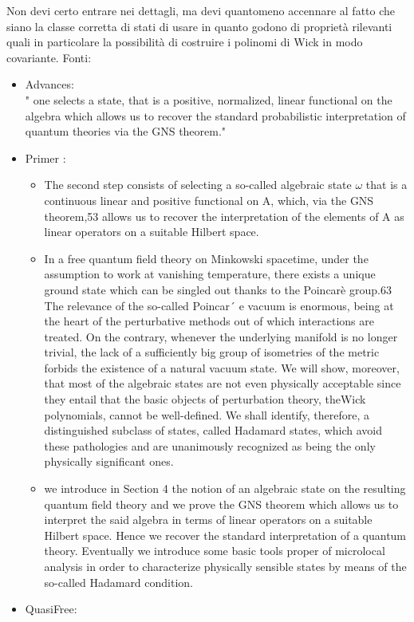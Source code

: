 \documentclass[Main]{subfiles}
\begin{document}
			\begin{Warning}
			Non devi certo entrare nei dettagli, ma devi quantomeno accennare al fatto che siano la classe corretta di stati di usare in quanto godono di proprietà rilevanti quali in particolare la possibilità di costruire i polinomi di Wick in modo covariante.
				Fonti: 
				\begin{itemize}
					\item Advances:\\
						" one selects a state, that is a positive, normalized, linear functional on the algebra which allows us to recover the standard probabilistic interpretation of quantum theories via the GNS theorem."
					\item Primer : 
						\begin{itemize}
							\item The second step consists of selecting a so-called algebraic state $\omega$ that is a continuous linear and positive functional on A, which, via the GNS theorem,53 allows us to recover the interpretation of the elements of A as linear operators on a suitable Hilbert space.
							\item  In a free quantum field theory on Minkowski spacetime, under the assumption to work at vanishing temperature, there exists a unique ground state which can be singled out thanks to the Poincarè group.63
								The relevance of the so-called Poincar´ e vacuum is enormous, being at the heart of the perturbative
methods out of which interactions are treated. 
								On the contrary, whenever the underlying manifold is no longer trivial, the lack of a sufficiently big group of isometries of the metric forbids the existence of a natural vacuum state. We will show, moreover, that most of the algebraic states are not even physically acceptable since they entail that the basic objects of perturbation theory, theWick polynomials, cannot be well-defined. 
								We shall identify, therefore, a distinguished subclass of states, called Hadamard states, which avoid these pathologies and are unanimously recognized as being the only physically significant ones.
							\item we introduce in Section 4 the notion of an algebraic state on the resulting quantum field theory and we prove the GNS theorem which allows us to interpret the said algebra in terms of linear operators on a suitable Hilbert space. 
								Hence we recover the standard interpretation of a quantum theory. Eventually we introduce some basic tools proper of microlocal analysis in order to characterize physically sensible states by means of the so-called Hadamard condition.
						\end{itemize}
					\item QuasiFree:\\
				\end{itemize}
			\end{Warning}
\end{document}
